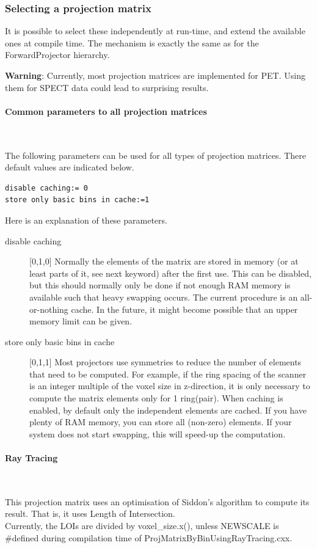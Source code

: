 \documentclass{article}
\newcommand{\subsubsubsection}[1]{\paragraph{#1}\mbox{} \\}
\begin{document}
{{\subsubsection{
Selecting a projection matrix}
\label{sec:projmatrix}
It is possible to select these independently at run-time, and 
extend the available ones at compile time. The mechanism is exactly 
the same as for the ForwardProjector hierarchy.

\textbf{Warning}: Currently, most projection matrices are implemented for PET. Using them for 
SPECT data could lead to surprising results. 

{ \subsubsubsection{Common parameters to all projection matrices}
}
\label{sec:projmatrixcommon}
The following parameters can be used for all types of projection 
matrices. There default values are indicated below.

\begin{verbatim}
disable caching:= 0
store only basic bins in cache:=1
\end{verbatim}

Here is an explanation of these parameters.

\begin{description}
\item[disable caching] [0,1,0{]}
Normally the elements of the matrix are stored in memory (or 
at least parts of it, see next keyword) after the first use. 
This can be disabled, but this should normally only be done if 
not enough RAM memory is available such that heavy swapping occurs. 
The current procedure is an all-or-nothing cache. In the future, 
it might become possible that an upper memory limit can be given.


\item[store only basic bins in cache] [0,1,1{]}
Most projectors use symmetries to reduce the number of elements 
that need to be computed. For example, if the ring spacing of 
the scanner is an integer multiple of the voxel size in z-direction, 
it is only necessary to compute the matrix elements only for 
1 ring(pair). When caching is enabled, by default only the independent 
elements are cached. If you have plenty of RAM memory, you can 
store all (non-zero) elements. If your system does not start 
swapping, this will speed-up the computation.
\end{description}

{ \subsubsubsection{Ray Tracing}
}
\label{sec:projmatrixusingraytracing}
This projection matrix uses an optimisation of Siddon's algorithm 
to compute its result. That is, it uses Length of Intersection.\\
Currently, the LOIs are divided by voxel\_size.x(), unless NEWSCALE 
is \#defined during compilation time of ProjMatrixByBinUsingRayTracing.cxx. 

}}
\end{document}
